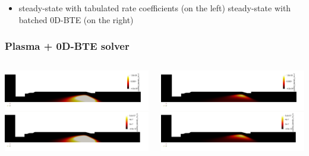 \documentclass[mathserif, aspectratio=169]{beamer}
\begin{document}
\begin{frame}
	\begin{itemize}
		\item steady-state with tabulated rate coefficients (on the left) steady-state with batched 0D-BTE (on the right)
	\end{itemize}
	\frametitle{Plasma + 0D-BTE solver}
	\begin{columns}
		\begin{column}{0.48\textwidth}
			\includegraphics[width=\columnwidth]{torch_0.png}
		\end{column}
		\begin{column}{0.48\textwidth}
			\includegraphics[width=\columnwidth]{torch_1.png}
		\end{column}
	\end{columns}
\end{frame}
\end{document}
